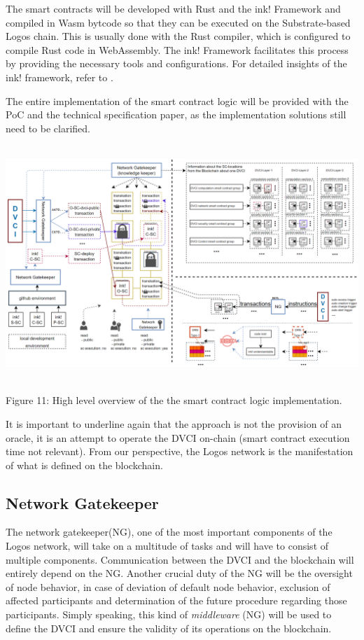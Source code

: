 \documentclass[]{article}
\begin{document}
The smart contracts will be developed with Rust \cite{rust-book} and the ink! Framework and compiled in Wasm bytcode so that they can be executed on the Substrate-based Logos chain. 
This is usually done with the Rust compiler, which is configured to compile Rust code in WebAssembly. 
The ink! Framework facilitates this process by providing the necessary tools and configurations.
For detailed insights of the ink! framework, refer to \cite{ink!articl}.

The entire implementation of the smart contract logic will be provided with the PoC and the technical specification paper, as the implementation solutions still need to be clarified.   

\begin{center}
	\includegraphics[height=8.9cm]{smart-contract-logic}
\end{center}
\begin{center}
	Figure 11: High level overview of the the smart contract logic implementation.
\end{center}

It is important to underline again that the approach is not the provision of an oracle, it is an attempt to operate the DVCI on-chain (smart contract execution time not relevant). 
From our perspective, the Logos network is the manifestation of what is defined on the blockchain.

\subsection{Network Gatekeeper}
The network gatekeeper(NG), one of the most important components of the Logos network, will take on a multitude of tasks and will have to consist of multiple components. 
Communication between the DVCI and the blockchain will entirely depend on the NG. 
Another crucial duty of the NG will be the oversight of node behavior, in case of deviation of default node behavior, exclusion of affected participants and determination of the future procedure regarding those participants.
Simply speaking, this kind of \textit{middleware} (NG) will be used to define the DVCI and ensure the validity of its operations on the blockchain.  
\end{document}
